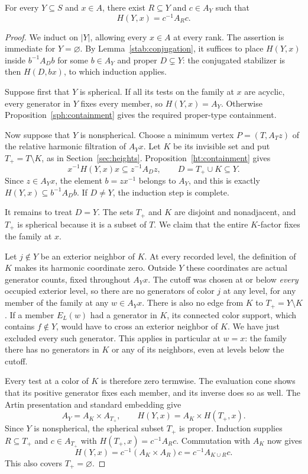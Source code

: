 \begin{theorem}
\label{stab:parabolic}
For every $Y\subseteq S$ and $x\in A$, there exist $R\subseteq Y$ and
$c\in A_Y$ such that
\[
 H(Y,x)=c^{-1}A_Rc.
\]
\end{theorem}
\begin{proof}
We induct on $|Y|$, allowing every $x\in A$ at every rank. The assertion
is immediate for $Y=\varnothing$. By Lemma~\ref{stab:conjugation}, it
suffices to place $H(Y,x)$ inside $b^{-1}A_Db$ for some $b\in A_Y$ and
proper $D\subsetneq Y$: the conjugated stabilizer is then $H(D,bx)$,
to which induction applies.

Suppose first that $Y$ is spherical. If all its tests on the family at
$x$ are acyclic, every generator in $Y$ fixes every member, so
$H(Y,x)=A_Y$. Otherwise Proposition~\ref{sph:containment} gives the
required proper-type containment.

Now suppose that $Y$ is nonspherical. Choose a minimum vertex
$P=(T,A_Tz)$ of the relative harmonic filtration of $A_Yx$. Let $K$ be
its invisible set and put $T_+=T\setminus K$, as in
Section~\ref{sec:heights}. Proposition~\ref{ht:containment} gives
\[
 x^{-1}H(Y,x)x\subseteq z^{-1}A_Dz,
 \qquad D=T_+\cup K\subseteq Y.
\]
Since $z\in A_Yx$, the element $b=zx^{-1}$ belongs to $A_Y$, and this
is exactly $H(Y,x)\subseteq b^{-1}A_Db$. If $D\ne Y$, the induction
step is complete.

It remains to treat $D=Y$. The sets $T_+$ and $K$ are disjoint and
nonadjacent, and $T_+$ is spherical because it is a subset of $T$.
We claim that the entire $K$-factor fixes the family at $x$.

Let $j\notin Y$ be an exterior neighbor of $K$. At every recorded level,
the definition of $K$ makes its harmonic coordinate zero. Outside $Y$
these coordinates are actual generator counts, fixed throughout $A_Yx$.
The cutoff was chosen at or below \emph{every} occupied exterior level,
so there are no generators of color $j$ at any level, for any member
of the family at any $w\in A_Yx$. There is also no
edge from $K$ to $T_+=Y\setminus K$. If a member $E_L(w)$ had a generator
in $K$, its connected color support, which contains $f\notin Y$, would
have to cross an exterior neighbor of $K$. We have just excluded every
such generator. This applies in particular at $w=x$: the family there
has no generators in $K$ or any of its neighbors, even at levels below
the cutoff.

Every test at a color of $K$ is therefore zero termwise. The evaluation
cone shows that its positive generator fixes each member, and its inverse
does so as well. The Artin presentation and standard embedding give
\[
 A_Y=A_K\times A_{T_+},
 \qquad H(Y,x)=A_K\times H(T_+,x).
\]
Since $Y$ is nonspherical, the spherical subset $T_+$ is proper.
Induction supplies $R\subseteq T_+$ and $c\in A_{T_+}$ with
$H(T_+,x)=c^{-1}A_Rc$. Commutation with $A_K$ now gives
\[
 H(Y,x)=c^{-1}(A_K\times A_R)c=c^{-1}A_{K\cup R}c.
\]
This also covers $T_+=\varnothing$.
\end{proof}

